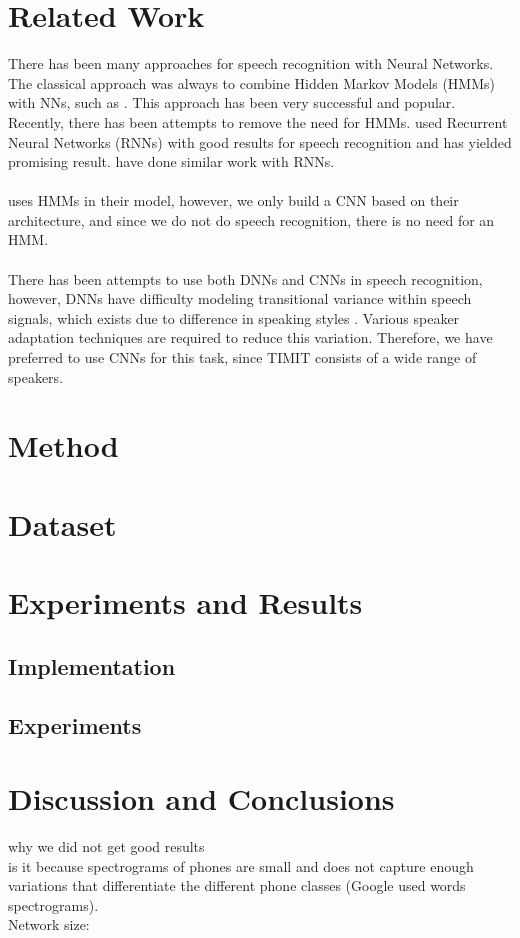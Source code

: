 \documentclass[a4paper,12pt]{article}
\begin{document}
\section{Related Work}
There has been many approaches for speech recognition with Neural Networks. The classical approach was always to combine Hidden Markov Models (HMMs) with NNs, such as \cite{robinson1994application}. This approach has been very successful and popular. Recently, there has been attempts to remove the need for HMMs. \cite{graves2013speech} used Recurrent Neural Networks (RNNs) with good results for speech recognition and has yielded promising result. \cite{graves2014towards} have done similar work with RNNs.\\\\
\cite{sainath2013deep} uses HMMs in their model, however, we only build a CNN based on their architecture, and since we do not do speech recognition, there is no need for an HMM.\\\\
There has been attempts to use both DNNs and CNNs in speech recognition, however, DNNs have difficulty modeling transitional variance within speech signals, which exists due to difference in speaking styles \cite{lecun1995convolutional}. Various speaker adaptation techniques are required to reduce this variation. Therefore, we have preferred to use CNNs for this task, since TIMIT consists of a wide range of speakers.

\section{Method}


\section{Dataset}\label{sec:spect}


\section{Experiments and Results}
\subsection{Implementation}
\label{sec:impl}

\subsection{Experiments}

\section{Discussion and Conclusions}
why we did not get good results\\
is it because spectrograms of phones are small and does not capture enough variations that differentiate the different phone classes (Google used words spectrograms).\\
Network size:



\end{document}
